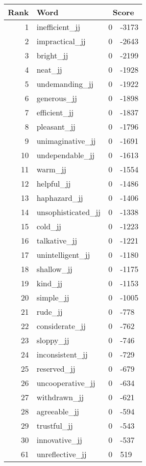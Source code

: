 \begin{longtable}[!htbp]{| rlr@{.}l |}
    \hline
    \textbf{Rank} & \textbf{Word} & \multicolumn{2}{c|}{\textbf{Score}} \\
    \hline
    \endhead
    1 & inefficient\_jj & 0 & -3173 \\
    2 & impractical\_jj & 0 & -2643 \\
    3 & bright\_jj & 0 & -2199 \\
    4 & neat\_jj & 0 & -1928 \\
    5 & undemanding\_jj & 0 & -1922 \\
    6 & generous\_jj & 0 & -1898 \\
    7 & efficient\_jj & 0 & -1837 \\
    8 & pleasant\_jj & 0 & -1796 \\
    9 & unimaginative\_jj & 0 & -1691 \\
    10 & undependable\_jj & 0 & -1613 \\
    11 & warm\_jj & 0 & -1554 \\
    12 & helpful\_jj & 0 & -1486 \\
    13 & haphazard\_jj & 0 & -1406 \\
    14 & unsophisticated\_jj & 0 & -1338 \\
    15 & cold\_jj & 0 & -1223 \\
    16 & talkative\_jj & 0 & -1221 \\
    17 & unintelligent\_jj & 0 & -1180 \\
    18 & shallow\_jj & 0 & -1175 \\
    19 & kind\_jj & 0 & -1153 \\
    20 & simple\_jj & 0 & -1005 \\
    21 & rude\_jj & 0 & -778 \\
    22 & considerate\_jj & 0 & -762 \\
    23 & sloppy\_jj & 0 & -746 \\
    24 & inconsistent\_jj & 0 & -729 \\
    25 & reserved\_jj & 0 & -679 \\
    26 & uncooperative\_jj & 0 & -634 \\
    27 & withdrawn\_jj & 0 & -621 \\
    28 & agreeable\_jj & 0 & -594 \\
    29 & trustful\_jj & 0 & -543 \\
    30 & innovative\_jj & 0 & -537 \\
    61 & unreflective\_jj & 0 & 519 \\

\end{longtable}

